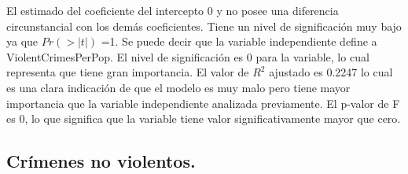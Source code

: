 \documentclass[a4paper,10pt,twocolumn]{article}
\begin{document}
\begin{itemize}
	El estimado del coeficiente del intercepto 0 y no posee una diferencia circunstancial con los demás coeficientes. Tiene un nivel de significación muy bajo ya que $Pr(> | t | )$ =1.
	Se puede decir que la variable independiente define a ViolentCrimesPerPop. El nivel de significación es 0 para la variable, lo cual representa que tiene gran importancia. El valor de $R^2$ ajustado es 0.2247 lo cual es una clara indicación de que el modelo es muy malo pero tiene mayor importancia que la variable independiente analizada previamente. El p-valor de F es 0, lo que significa que la variable tiene valor significativamente mayor que cero.

\end{itemize}

\subsection*{Crímenes no violentos.}
\end{document}
